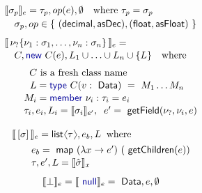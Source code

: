 \documentclass[10pt,preprint,blind,clearpagebib]{sigplanconf}
\newcommand{\langl}{\begin{picture}(4.5,7)
\put(1.1,2.5){\rotatebox{60}{\line(1,0){5.5}}}
\put(1.1,2.5){\rotatebox{300}{\line(1,0){5.5}}}
\end{picture}}
\newcommand{\rangl}{\begin{picture}(4.5,7)
\put(.9,2.5){\rotatebox{120}{\line(1,0){5.5}}}
\put(.9,2.5){\rotatebox{240}{\line(1,0){5.5}}}
\end{picture}}
\newcommand{\kvd}[1]{\textnormal{\textcolor{kvdclr}{\sffamily #1}}}
\newcommand{\ident}[1]{\textnormal{\sffamily #1}}
\newcommand{\sem}[1]{\llbracket #1 \rrbracket}
\begin{document}
\begin{figure}
\begin{multicols}{2}
\noindent
\begin{equation*}
\begin{array}{l}
 \sem{\sigma_p}_e = \tau_p,op(e),\emptyset\quad\textnormal{where}~\tau_p = \sigma_p \\[0.2em]
\quad\sigma_p, op\in  \{~(\ident{decimal},\ident{asDec}), (\ident{float},\ident{asFloat})~\}
\end{array}
\end{equation*}
%
\begin{equation*}
\begin{array}{l}
 \sem{\,\nu_? \{ \nu_1 : \sigma_1, \ldots, \nu_n : \sigma_n \}\,}_e = \\[0.1em]
 \quad C, \kvd{new}~C(e), L_1\cup\ldots\cup L_n\cup\{ L \}\quad\textnormal{where}\\[0.6em]
 \qquad \;\;C~\textnormal{is a fresh class name} \\[0.1em]
 \qquad \;\,\,L = \kvd{type}~C(v:\ident{Data})~=~M_1\ldots M_n  \\[0.1em]
 \qquad M_i = \kvd{member}~\nu_i:\tau_i=e_i\\[0.1em]
 \qquad \tau_i, e_i, L_i = \sem{\sigma_i}_{e'},\;\; e'=\ident{getField}(\nu_?, \nu_i, e)\\[0.6em]
\end{array}
\end{equation*}
%
\begin{equation*}
\begin{array}{l}
 \sem{\,[\sigma]\,}_e = \ident{list}\langl\tau\rangl, e_b, L \;\;\textnormal{where}\\[0.4em]
 \qquad e_b = \ident{map}~(\lambda x\rightarrow e')~(\ident{getChildren}(e)) \\[0.1em]
 \qquad \tau, e', L = \sem{\hat{\sigma}}_x
\end{array}
\end{equation*}
%
\begin{equation*}
\begin{array}{l}
 \sem{\bot}_e = \sem{\kvd{null}}_e = \ident{Data}, e, \emptyset
\end{array}
\end{equation*}


\end{multicols}
\end{figure}
\end{document}

